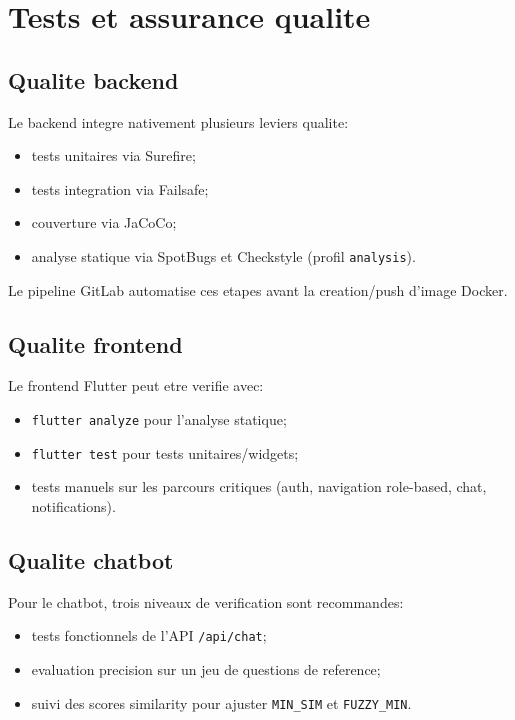 \chapter{Tests et assurance qualite}

\section{Qualite backend}

Le backend integre nativement plusieurs leviers qualite:
\begin{itemize}[leftmargin=*]
  \item tests unitaires via Surefire;
  \item tests integration via Failsafe;
  \item couverture via JaCoCo;
  \item analyse statique via SpotBugs et Checkstyle (profil \texttt{analysis}).
\end{itemize}

Le pipeline GitLab automatise ces etapes avant la creation/push d'image Docker.

\section{Qualite frontend}

Le frontend Flutter peut etre verifie avec:
\begin{itemize}[leftmargin=*]
  \item \texttt{flutter analyze} pour l'analyse statique;
  \item \texttt{flutter test} pour tests unitaires/widgets;
  \item tests manuels sur les parcours critiques (auth, navigation role-based, chat, notifications).
\end{itemize}

\section{Qualite chatbot}

Pour le chatbot, trois niveaux de verification sont recommandes:
\begin{itemize}[leftmargin=*]
  \item tests fonctionnels de l'API \texttt{/api/chat};
  \item evaluation precision sur un jeu de questions de reference;
  \item suivi des scores similarity pour ajuster \texttt{MIN\_SIM} et \texttt{FUZZY\_MIN}.
\end{itemize}

